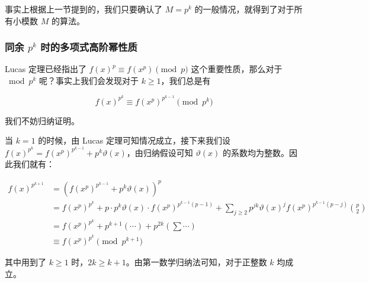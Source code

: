 \documentclass[12pt]{ctexart}
\begin{document}
事实上根据上一节提到的，我们只要确认了 $M=p^k$ 的一般情况，就得到了对于所有小模数 $M$ 的算法。

\subsubsection{同余 $p^k$ 时的多项式高阶幂性质}

Lucas 定理已经指出了 $f(x)^p\equiv f(x^p) \pmod p$ 这个重要性质，那么对于 $\bmod p^k$ 呢？事实上我们会发现对于 $k\ge 1$，我们总是有

$$
f(x)^{p^k} \equiv f(x^p)^{p^{k-1}} \pmod {p^k}
$$

我们不妨归纳证明。

当 $k=1$ 的时候，由 Lucas 定理可知情况成立，接下来我们设 $f(x)^{p^k} = f(x^p)^{p^{k-1}} + p^k \vartheta(x)$，由归纳假设可知 $\vartheta(x)$ 的系数均为整数。因此我们就有：

\begin{align*}
f(x)^{p^{k+1}} &= \left(f(x^p)^{p^{k-1}} + p^k \vartheta(x)\right)^p\\
 &= f(x^p)^{p^k} + p \cdot p^k \vartheta(x) \cdot f(x^p)^{p^{k-1}(p-1)} + \sum_{j\ge 2}  p^{jk} \vartheta(x)^j f(x^p)^{p^{k-1}(p-j)}\binom p 2 \\
 &= f(x^p)^{p^k} + p^{k+1} (\cdots) + p^{2k}\left(\sum \cdots\right)\\
 &\equiv f(x^p)^{p^k} \pmod {p^{k+1}}
\end{align*}

其中用到了 $k\ge 1$ 时，$2k\ge k+1$。由第一数学归纳法可知，对于正整数 $k$ 均成立。
\end{document}
